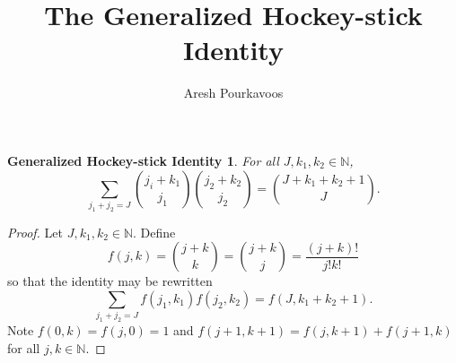 \documentclass{article}
\begin{document}
\title{The Generalized Hockey-stick Identity}
\author{Aresh Pourkavoos}
\maketitle

\newtheorem*{GHSI}{Generalized Hockey-stick Identity}

\begin{GHSI}

For all $J, k_1, k_2 \in \mathbb{N}$,
\[\sum_{j_1+j_2=J}\binom{j_i+k_1}{j_1}\binom{j_2+k_2}{j_2} = \binom{J+k_1+k_2+1}{J}.\]

\end{GHSI}

\begin{proof}

Let $J, k_1, k_2 \in \mathbb{N}$. Define
\[f(j, k) = \binom{j+k}{k} =  \binom{j+k}{j} = \frac{(j+k)!}{j!k!}\]
so that the identity may be rewritten 
\[\sum_{j_1+j_2=J}f(j_1, k_1)f(j_2, k_2) = f(J, k_1+k_2+1).\]
Note $f(0, k)=f(j, 0)=1$ and $f(j+1, k+1)=f(j, k+1)+f(j+1, k)$ for all $j, k\in\mathbb{N}$.


\end{proof}
\end{document}
